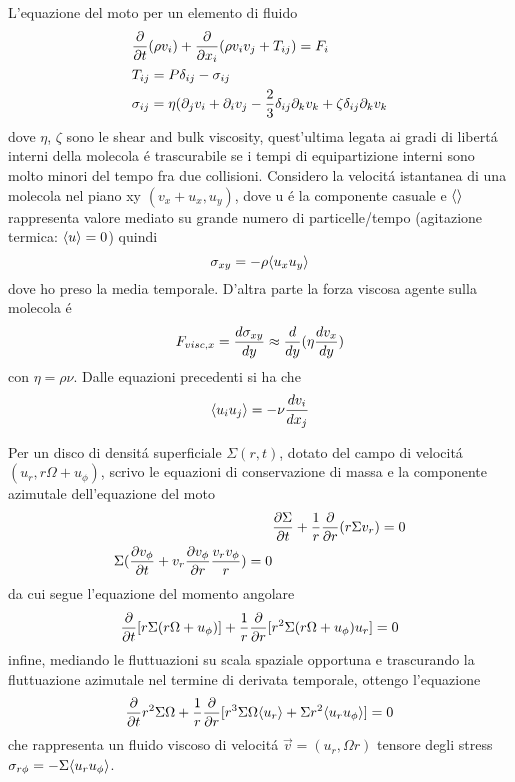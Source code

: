 L'equazione del moto per un elemento di fluido
\begin{align}
&\PDof{t}(\rho v_i)+\PDof{x_i}(\rho v_iv_j+T_{ij})=F_i\\
&T_{ij}=P\delta_{ij}-\sigma_{ij}\\
&\sigma_{ij}=\eta(\partial_jv_i+\partial_iv_j-\frac{2}{3}\delta_{ij}\partial_kv_k+\zeta\delta_{ij}\partial_kv_k
\end{align}
dove $\eta$, $\zeta$ sono le shear and bulk viscosity, quest'ultima legata ai gradi di libert\'a interni della molecola \'e trascurabile se i tempi di equipartizione interni sono molto minori del tempo fra due collisioni.
Considero la velocit\'a istantanea di una molecola nel piano xy $(v_x+u_x,u_y)$, dove u \'e la componente casuale e $\exv{}$ rappresenta valore mediato su grande numero di particelle/tempo (agitazione termica: $\exv{u}=0$) quindi
\begin{equation}
\sigma_{xy}=-\rho\exv{u_xu_y}
\end{equation}
dove ho preso la media temporale.
D'altra parte la forza viscosa agente sulla molecola \'e
\begin{equation}
F_{visc,x}=\TDy{y}{\sigma_{xy}}\approx\TDof{y}(\eta\TDy{y}{v_x})
\end{equation}
con $\eta=\rho\nu$.
Dalle equazioni precedenti si ha che
\begin{equation}
\exv{u_iu_j}=-\nu\TDy{x_j}{v_i}
\end{equation}

Per un disco di densit\'a superficiale $\Sigma(r,t)$, dotato del campo di velocit\'a $(u_r,r\Omega+u_{\phi})$, scrivo le equazioni di conservazione di massa e la componente azimutale dell'equazione del moto
\begin{align}
&\PDy{t}{\Sigma}+\frac{1}{r}\PDof{r}(r\Sigma v_r)=0\\
\Sigma(\PDy{t}{v_{\phi}}+v_r\PDy{r}{v_{\phi}}\frac{v_rv_{\phi}}{r})=0
\end{align}
da cui segue l'equazione del momento angolare
\begin{equation}
\PDof{t}[r\Sigma(r\Omega+u_{\phi})]+\frac{1}{r}\PDof{r}[r^2\Sigma(r\Omega+u_{\phi})u_r]=0
\end{equation}
infine, mediando le fluttuazioni su scala spaziale opportuna e trascurando la fluttuazione azimutale nel termine di derivata temporale, ottengo l'equazione
\begin{equation}
\PDof{t}r^2\Sigma\Omega+\frac{1}{r}\PDof{r}[r^3\Sigma\Omega\exv{u_r}+\Sigma r^2\exv{u_ru_{\phi}}]=0
\end{equation}
che rappresenta un fluido viscoso di velocit\'a $\vec{v}=(u_r,\Omega r)$ tensore degli stress $\sigma_{r\phi}=-\Sigma\exv{u_ru_{\phi}}$.

